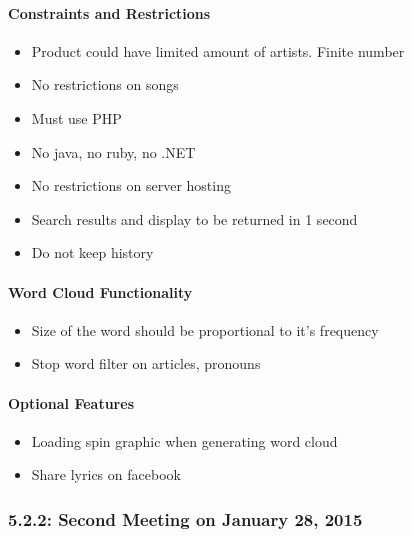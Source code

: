 \documentclass[]{article}
\begin{document}
\paragraph{Constraints and
Restrictions}\label{constraints-and-restrictions}

\begin{itemize}
\itemsep1pt\parskip0pt
\item
  Product could have limited amount of artists. Finite number
\item
  No restrictions on songs
\item
  Must use PHP
\item
  No java, no ruby, no .NET
\item
  No restrictions on server hosting
\item
  Search results and display to be returned in 1 second
\item
  Do not keep history
\end{itemize}

\paragraph{Word Cloud Functionality}\label{word-cloud-functionality}

\begin{itemize}
\itemsep1pt\parskip0pt
\item
  Size of the word should be proportional to it's frequency
\item
  Stop word filter on articles, pronouns
\end{itemize}

\paragraph{Optional Features}\label{optional-features}

\begin{itemize}
\itemsep1pt\parskip0pt
\item
  Loading spin graphic when generating word cloud
\item
  Share lyrics on facebook
\end{itemize}

\subsubsection{5.2.2: Second Meeting on January 28,
2015}\label{second-meeting-on-january-28-2015}
\end{document}

